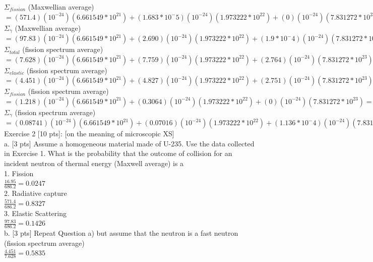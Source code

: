 \documentclass[12pt,fleqn, parskip=full]{scrartcl}
\begin{document}
$\Sigma_{fission}$ (Maxwellian average)$  = (571.4 )(10^{-24})(6.661549*10^21)+(1.683*10^-5)(10^{-24})(1.973222*10^22)+(0)(10^{-24})(7.831272*10^23) = 0.990686414 [cm^-1]$\\

$\Sigma_{\gamma}$ (Maxwellian average) $ = (97.83)(10^{-24})(6.661549*10^21)+(2.690)(10^{-24})(1.973222*10^22)+(1.9*10^-4)(10^{-24})(7.831272*10^23) = 0.169765266 [cm^-1]$\\

$\Sigma_{total}$ (fission spectrum average) $ = (7.628)(10^{-24})(6.661549*10^21)+(7.759)(10^{-24})(1.973222*10^22)+(2.764)(10^{-24})(7.831272*10^23) = 2.177788915 [cm^-1]$\\

$\Sigma_{elastic}$ (fission spectrum average) $ = (4.451)(10^{-24})(6.661549*10^21)+(4.827)(10^{-24})(1.973222*10^22)+(2.751)(10^{-24})(7.831272*10^23) = 2.132100017 [cm^-1]$\\

$\Sigma_{fission}$ (fission spectrum average) $  = (1.218)(10^{-24})(6.661549*10^21)+(0.3064)(10^{-24})(1.973222*10^22)+(0)(10^{-24})(7.831272*10^23) = 0.002111754 [cm^-1]$\\

$\Sigma_{\gamma}$ (fission spectrum average) $ = (0.08741)(10^{-24})(6.661549*10^21)+(0.07016)(10^{-24})(1.973222*10^22)+(1.136*10^-4)(10^{-24})(7.831272*10^23) = 2.405136515*10^-4 [cm^-1]$\\


Exercise 2 [10 pts]: [on the meaning of microscopic XS]\\
a. [3 pts] Assume a homogeneous material made of U-235. Use the data collected in Exercise 1. What is the probability that the outcome of collision for an incident neutron of thermal energy (Maxwell average) is a\\
1. Fission\\
$\frac{16.95}{686.2} = 0.0247$\\

2. Radiative capture\\
$\frac{571.4}{686.2} = 0.8327$\\

3. Elastic Scattering\\
$\frac{97.83}{686.2} = 0.1426$\\

b. [3 pts] Repeat Question a) but assume that the neutron is a fast neutron (fission spectrum average)\\
$\frac{4.451}{7.628} = 0.5835$\\
\end{document}
